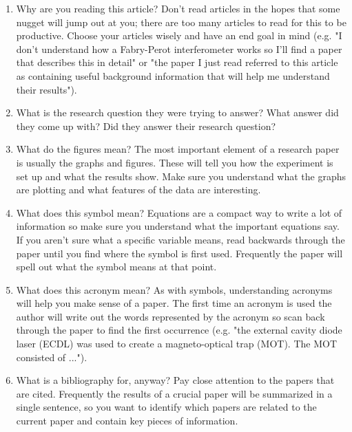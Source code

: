 \documentclass[12pt, letterpaper]{article}
\begin{document}
\begin{enumerate}

  \item Why are you reading this article?  Don't read articles in the hopes that some nugget will jump out at you; there are too many articles to read for this to be productive.  Choose your articles wisely and have an end goal in mind (e.g. "I don't understand how a Fabry-Perot interferometer works so I'll find a paper that describes this in detail" or "the paper I just read referred to this article as containing useful background information that will help me understand their results").

  \item What is the research question they were trying to answer?  What answer did they come up with?  Did they answer their research question?

  \item What do the figures mean?  The most important element of a research paper is usually the graphs and figures.  These will tell you how the experiment is set up and what the results show.  Make sure you understand what the graphs are plotting and what features of the data are interesting.

  \item What does this symbol mean?  Equations are a compact way to write a lot of information so make sure you understand what the important equations say.  If you aren't sure what a specific variable means, read backwards through the paper until you find where the symbol is first used.  Frequently the paper will spell out what the symbol means at that point.

  \item What does this acronym mean?  As with symbols, understanding acronyms will help you make sense of a paper.  The first time an acronym is used the author will write out the words represented by the acronym so scan back through the paper to find the first occurrence (e.g. "the external cavity diode laser (ECDL) was used to create a magneto-optical trap (MOT).  The MOT consisted of ...").

  \item What is a bibliography for, anyway?  Pay close attention to the papers that are cited.  Frequently the results of a crucial paper will be summarized in a single sentence, so you want to identify which papers are related to the current paper and contain key pieces of information.

\end{enumerate}
\end{document}
